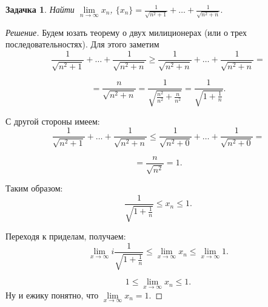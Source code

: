 \documentclass[a4paper,12pt]{article}
\newtheorem*{task}{Задачка}
\begin{document}
    \begin{task} %
        Найти $\lim\limits_{n \to \infty} x_n$, $\{x_n\} = \frac{1}{\sqrt{n^2 + 1}} +  \ldots + \frac{1}{\sqrt{n^2 + n}}. $
    \end{task}
    \begin{proof}[Решение]
    Будем юзать теорему о двух милиционерах (или о трех последовательностях). Для этого заметим
    $$ \frac{1}{\sqrt{n^2 + 1}} +  \ldots + \frac{1}{\sqrt{n^2 + n}} \geq 
       \frac{1}{\sqrt{n^2 + n}} +  \ldots + \frac{1}{\sqrt{n^2 + n}} = $$

    $$ = \frac{n}{\sqrt{n^2 + n}} = \frac{1}{\sqrt{\frac{n^2}{n^2} + \frac{n}{n^2}}} = \frac{1}{\sqrt{1 + \frac{1}{n}}}.$$

    С другой стороны имеем:
    $$ \frac{1}{\sqrt{n^2 + 1}} +  \ldots + \frac{1}{\sqrt{n^2 + n}} \leq 
       \frac{1}{\sqrt{n^2 + 0}} +  \ldots + \frac{1}{\sqrt{n^2 + 0}} = $$

    $$ = \frac{n}{\sqrt{n^2}} = 1.$$

    Таким образом:
    $$\frac{1}{\sqrt{1 + \frac{1}{n}}} \leq x_n \leq 1.$$

    Переходя к приделам, получаем:
        $$\lim\limits_{x \to \infty}i\frac{1}{\sqrt{1 + \frac{1}{n}}} \leq \lim\limits_{x \to \infty}x_n \leq \lim\limits_{x \to \infty}1.$$

        $$1\leq \lim\limits_{x \to \infty}x_n \leq 1.$$
    Ну и ежику понятно, что $\lim\limits_{x \to \infty}x_n = 1$.
    \end{proof}
\end{document}
